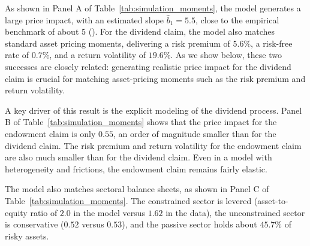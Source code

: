 \documentclass[12pt,english]{article}
\newcommand{\PIDhat}{5.5}        %
\newcommand{\PIYhat}{0.55}        %
\newcommand{\RPbase}{5.6\%}       %
\newcommand{\rfbase}{0.7\%}       %
\newcommand{\volbase}{19.6\%}     %
\begin{document}
As shown in Panel A of Table~\ref{tab:simulation_moments}, the model generates a large price impact, with an estimated slope $\hat{b}_1 = \PIDhat$, close to the empirical benchmark of about $5$ (\citealp{gabaix2020search}).
For the dividend claim, the model also matches standard asset pricing moments, delivering a risk premium of $\RPbase$, a risk-free rate of $\rfbase$, and a return volatility of $\volbase$.
As we show below, these two successes are closely related: generating realistic price impact for the dividend claim is crucial for matching asset-pricing moments such as the risk premium and return volatility.

A key driver of this result is the explicit modeling of the dividend process.
Panel B of Table~\ref{tab:simulation_moments} shows that the price impact for the endowment claim is only $\PIYhat$, an order of magnitude smaller than for the dividend claim.
The risk premium and return volatility for the endowment claim are also much smaller than for the dividend claim.
Even in a model with heterogeneity and frictions, the endowment claim remains fairly elastic.

The model also matches sectoral balance sheets, as shown in Panel C of Table~\ref{tab:simulation_moments}.
The constrained sector is levered (asset-to-equity ratio of $2.0$ in the model versus $1.62$ in the data), the unconstrained sector is conservative ($0.52$ versus $0.53$), and the passive sector holds about $45.7\%$ of risky assets.


\end{document}
